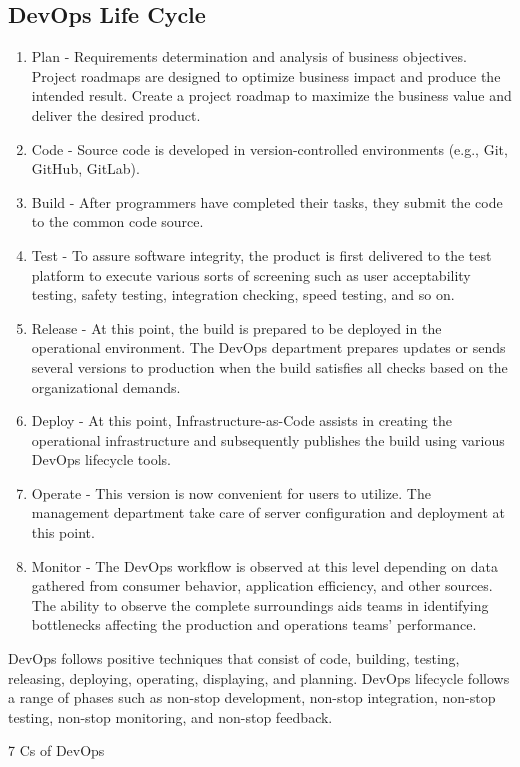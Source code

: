 \documentclass[12pt]{book}
\begin{document}
\subsection{DevOps Life Cycle}
\begin{enumerate}
    \item Plan - Requirements determination and analysis of business objectives. Project roadmaps are designed to optimize business impact and produce the intended result. Create a project roadmap to maximize the business value and deliver the desired product.
    \item Code - Source code is developed in version-controlled environments (e.g., Git, GitHub, GitLab). 
    \item Build - After programmers have completed their tasks, they submit the code to the common code source. 
    \item Test - To assure software integrity, the product is first delivered to the test platform to execute various sorts of screening such as user acceptability testing, safety testing, integration checking, speed testing, and so on.  
    \item Release - At this point, the build is prepared to be deployed in the operational environment. The DevOps department prepares updates or sends several versions to production when the build satisfies all checks based on the organizational demands.
    \item Deploy - At this point, Infrastructure-as-Code assists in creating the operational infrastructure and subsequently publishes the build using various DevOps lifecycle tools.
    \item Operate - This version is now convenient for users to utilize. The management department take care of server configuration and deployment at this point. 
    \item Monitor - The DevOps workflow is observed at this level depending on data gathered from consumer behavior, application efficiency, and other sources. The ability to observe the complete surroundings aids teams in identifying bottlenecks affecting the production and operations teams' performance. 
\end{enumerate}
DevOps follows positive techniques that consist of code, building, testing, releasing, deploying, operating, displaying, and planning. DevOps lifecycle follows a range of phases such as non-stop development, non-stop integration, non-stop testing, non-stop monitoring, and non-stop feedback. 


7 Cs of DevOps 
\end{document}
